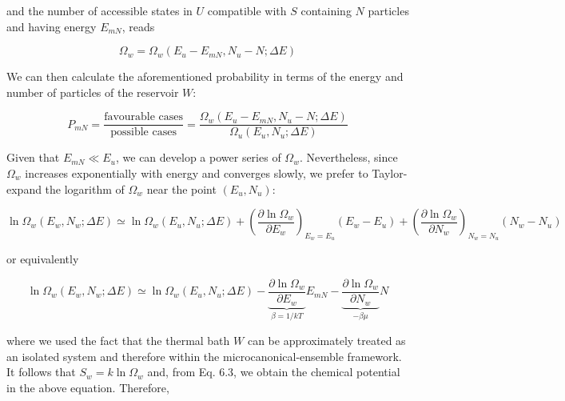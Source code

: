 \documentclass[12pt,a4paper]{report}
\newcommand{\esp}{\vspace{0.5cm}}
\begin{document}
	\esp
	
	and the number of accessible states in $U$ compatible with $S$ containing $N$ particles and having energy $E_{mN}$, reads
	
	\esp
	
	\begin{equation}
		\Omega_w = \Omega_w(E_u - E_{mN}, N_u - N; \Delta E) \tag{6.15}
	\end{equation}
	
	\esp
	
	We can then calculate the aforementioned probability in terms of the energy and number of particles of the reservoir $W$:
	
	\esp
	
	\begin{equation}
		P_{mN} = \frac{\text{favourable cases}}{\text{possible cases}} = \frac{\Omega_w(E_u - E_{mN}, N_u - N; \Delta E)}{\Omega_u(E_u, N_u; \Delta E)} \tag{6.16}
	\end{equation}
	
	\esp
	
	Given that $E_{mN} \ll E_u$, we can develop a power series of $\Omega_w$. Nevertheless, since $\Omega_w$ increases exponentially with energy and converges slowly, we prefer to Taylor-expand the logarithm of $\Omega_w$ near the point $(E_u, N_u)$:
	
	\esp
	
	\begin{equation}
		\ln \Omega_w(E_w, N_w; \Delta E) \simeq \ln \Omega_w(E_u, N_u; \Delta E) + \left( \frac{\partial \ln \Omega_w}{\partial E_w} \right)_{E_w=E_u} (E_w - E_u) + \left( \frac{\partial \ln \Omega_w}{\partial N_w} \right)_{N_w=N_u} (N_w - N_u) \tag{6.17}
	\end{equation}
	
	\esp
	
	\noindent or equivalently
	
	\esp
	
	\begin{equation}
		\ln \Omega_w(E_w, N_w; \Delta E) \simeq \ln \Omega_w(E_u, N_u; \Delta E) - \underbrace{\frac{\partial \ln \Omega_w}{\partial E_w}}_{\beta=1/kT} E_{mN} - \underbrace{\frac{\partial \ln \Omega_w}{\partial N_w}}_{-\beta\mu} N \tag{6.18}
	\end{equation}
	
	\esp
	
	where we used the fact that the thermal bath $W$ can be approximately treated as an isolated system and therefore within the microcanonical-ensemble framework. It follows that $S_w = k \ln \Omega_w$ and, from Eq. 6.3, we obtain the chemical potential in the above equation. Therefore,
	
\end{document}
